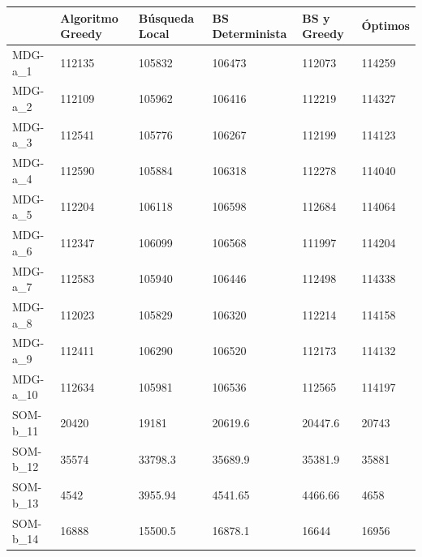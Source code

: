 \documentclass[11pt,a4paper]{article}
\begin{document}
	\begin{table}[H]
		\begin{tabular}{l|l|l|l|l|l|}
			\cline{2-6}
			& Algoritmo Greedy & Búsqueda Local & BS Determinista & BS y Greedy & Óptimos \\ \hline
			\multicolumn{1}{|l|}{MDG-a\_1}  & 112135           & 105832         & 106473          & 112073      & 114259            \\ \hline
			\multicolumn{1}{|l|}{MDG-a\_2}  & 112109           & 105962         & 106416          & 112219      & 114327            \\ \hline
			\multicolumn{1}{|l|}{MDG-a\_3}  & 112541           & 105776         & 106267          & 112199      & 114123            \\ \hline
			\multicolumn{1}{|l|}{MDG-a\_4}  & 112590           & 105884         & 106318          & 112278      & 114040            \\ \hline
			\multicolumn{1}{|l|}{MDG-a\_5}  & 112204           & 106118         & 106598          & 112684      & 114064            \\ \hline
			\multicolumn{1}{|l|}{MDG-a\_6}  & 112347           & 106099         & 106568          & 111997      & 114204            \\ \hline
			\multicolumn{1}{|l|}{MDG-a\_7}  & 112583           & 105940         & 106446          & 112498      & 114338            \\ \hline
			\multicolumn{1}{|l|}{MDG-a\_8}  & 112023           & 105829         & 106320          & 112214      & 114158            \\ \hline
			\multicolumn{1}{|l|}{MDG-a\_9}  & 112411           & 106290         & 106520          & 112173      & 114132            \\ \hline
			\multicolumn{1}{|l|}{MDG-a\_10} & 112634           & 105981         & 106536          & 112565      & 114197            \\ \hline
			\multicolumn{1}{|l|}{SOM-b\_11} & 20420            & 19181          & 20619.6         & 20447.6     & 20743             \\ \hline
			\multicolumn{1}{|l|}{SOM-b\_12} & 35574            & 33798.3        & 35689.9         & 35381.9     & 35881             \\ \hline
			\multicolumn{1}{|l|}{SOM-b\_13} & 4542             & 3955.94        & 4541.65         & 4466.66     & 4658              \\ \hline
			\multicolumn{1}{|l|}{SOM-b\_14} & 16888            & 15500.5        & 16878.1         & 16644       & 16956             \\ \hline

\end{tabular}
\end{table}
\end{document}
